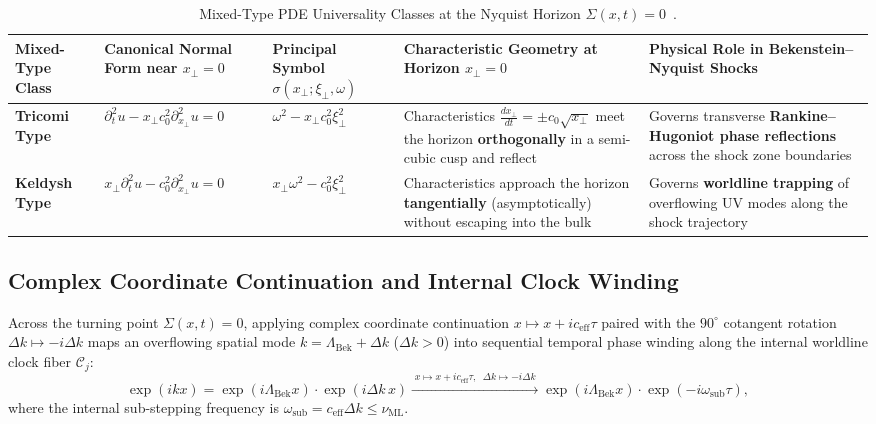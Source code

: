 \documentclass[11pt,a4paper]{article}
\theoremstyle{definition}
\begin{document}
\begin{table}[htbp]
\centering
\caption{Mixed-Type PDE Universality Classes at the Nyquist Horizon $\Sigma(x,t) = 0$~\cite{tricomi1923,keldysh1951}.}
\label{tab:mixed-type-pde}
\footnotesize
\begin{tabular}{L{2.0cm}L{3.1cm}L{2.5cm}L{3.0cm}L{3.0cm}}
\toprule
\textbf{Mixed-Type Class} & \textbf{Canonical Normal Form near $x_{\perp} = 0$} & \textbf{Principal Symbol $\sigma(x_{\perp}; \xi_{\perp}, \omega)$} & \textbf{Characteristic Geometry at Horizon $x_{\perp} = 0$} & \textbf{Physical Role in Bekenstein--Nyquist Shocks} \\
\midrule
\textbf{Tricomi Type}~\cite{tricomi1923} & $\partial_t^2 u - x_{\perp} c_0^2 \partial_{x_{\perp}}^2 u = 0$ & $\omega^2 - x_{\perp} c_0^2 \xi_{\perp}^2$ & Characteristics $\frac{dx_{\perp}}{dt} = \pm c_0 \sqrt{x_{\perp}}$ meet the horizon \textbf{orthogonally} in a semi-cubic cusp and reflect & Governs transverse \textbf{Rankine--Hugoniot phase reflections} across the shock zone boundaries \\
\addlinespace
\textbf{Keldysh Type}~\cite{keldysh1951} & $x_{\perp} \partial_t^2 u - c_0^2 \partial_{x_{\perp}}^2 u = 0$ & $x_{\perp} \omega^2 - c_0^2 \xi_{\perp}^2$ & Characteristics approach the horizon \textbf{tangentially} (asymptotically) without escaping into the bulk & Governs \textbf{worldline trapping} of overflowing UV modes along the shock trajectory \\
\bottomrule
\end{tabular}
\end{table}
\subsection{Complex Coordinate Continuation and Internal Clock Winding}
\label{subsec:phase2-analytic}
Across the turning point $\Sigma(x,t) = 0$, applying complex coordinate continuation $x \mapsto x + i c_{\text{eff}} \tau$ paired with the $90^\circ$ cotangent rotation $\Delta k \mapsto -i \Delta k$ maps an overflowing spatial mode $k = \Lambda_{\text{Bek}} + \Delta k$ ($\Delta k > 0$) into sequential temporal phase winding along the internal worldline clock fiber $\mathcal{C}_j$:
\begin{equation}
\exp(i k x) = \exp(i \Lambda_{\text{Bek}} x) \cdot \exp(i \Delta k \, x) \xrightarrow{\; x \mapsto x + i c_{\text{eff}} \tau, \;\; \Delta k \mapsto -i \Delta k \;} \exp(i \Lambda_{\text{Bek}} x) \cdot \exp(-i \omega_{\text{sub}} \tau),
\end{equation}
where the internal sub-stepping frequency is $\omega_{\text{sub}} = c_{\text{eff}} \Delta k \le \nu_{\text{ML}}$.
\end{document}
